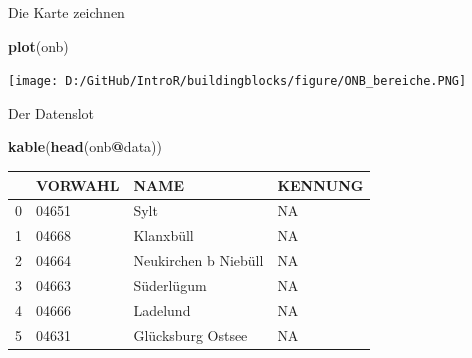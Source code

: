 \documentclass[ignorenonframetext,]{beamer}
\newenvironment{Shaded}{\begin{snugshade}}{\end{snugshade}}
\newcommand{\KeywordTok}[1]{\textcolor[rgb]{0.13,0.29,0.53}{\textbf{#1}}}
\newcommand{\NormalTok}[1]{#1}
\newcommand{\OperatorTok}[1]{\textcolor[rgb]{0.81,0.36,0.00}{\textbf{#1}}}
\begin{document}
\begin{frame}[fragile]{Die Karte zeichnen}
\protect\hypertarget{die-karte-zeichnen}{}

\begin{Shaded}
\begin{Highlighting}[]
\KeywordTok{plot}\NormalTok{(onb)}
\end{Highlighting}
\end{Shaded}

\texttt{[image: D:/GitHub/IntroR/buildingblocks/figure/ONB\_bereiche.PNG]}

\end{frame}

\begin{frame}[fragile]{Der Datenslot}
\protect\hypertarget{der-datenslot}{}

\begin{Shaded}
\begin{Highlighting}[]
\KeywordTok{kable}\NormalTok{(}\KeywordTok{head}\NormalTok{(onb}\OperatorTok{@}\NormalTok{data))}
\end{Highlighting}
\end{Shaded}

\begin{longtable}[]{@{}llll@{}}
\toprule
& VORWAHL & NAME & KENNUNG\tabularnewline
\midrule
\endhead
0 & 04651 & Sylt & NA\tabularnewline
1 & 04668 & Klanxbüll & NA\tabularnewline
2 & 04664 & Neukirchen b Niebüll & NA\tabularnewline
3 & 04663 & Süderlügum & NA\tabularnewline
4 & 04666 & Ladelund & NA\tabularnewline
5 & 04631 & Glücksburg Ostsee & NA\tabularnewline
\bottomrule
\end{longtable}

\end{frame}
\end{document}
